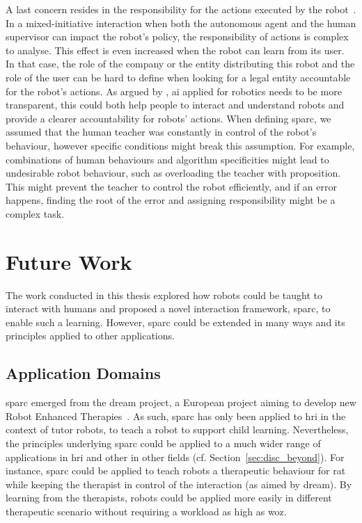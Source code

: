 A last concern resides in the responsibility for the actions executed by the robot~\citep{asaro2007robots}. In a mixed-initiative interaction when both the autonomous agent and the human supervisor can impact the robot's policy, the responsibility of actions is complex to analyse. This effect is even increased when the robot can learn from its user. In that case, the role of the company or the entity distributing this robot and the role of the user can be hard to define when looking for a legal entity accountable for the robot's actions. As argued by \cite{wachter2017transparent}, \gls{ai} applied for robotics needs to be more transparent, this could both help people to interact and understand robots and provide a clearer accountability for robots' actions. When defining \gls{sparc}, we assumed that the human teacher was constantly in control of the robot's behaviour, however specific conditions might break this assumption. For example, combinations of human behaviours and algorithm specificities might lead to undesirable robot behaviour, such as overloading the teacher with proposition. This might prevent the teacher to control the robot efficiently, and if an error happens, finding the root of the error and assigning responsibility might be a complex task.

\section{Future Work}


The work conducted in this thesis explored how robots could be taught to interact with humans and proposed a novel interaction framework, \gls{sparc}, to enable such a learning. However, \gls{sparc} could be extended in many ways and its principles applied to other applications.

\subsection{Application Domains}

\gls{sparc} emerged from the \acrshort{dream} project, a European project aiming to develop new Robot Enhanced Therapies~\citep{thill2012robot,esteban2017build}. As such, \gls{sparc} has only been applied to \gls{hri} in the context of tutor robots, to teach a robot to support child learning. Nevertheless, the principles underlying \gls{sparc} could be applied to a much wider range of applications in \gls{hri} and other in other fields (cf. Section~\ref{sec:disc_beyond}). For instance, \gls{sparc} could be applied to teach robots a therapeutic behaviour for \gls{rat} while keeping the therapist in control of the interaction (as aimed by \acrshort{dream}). By learning from the therapists, robots could be applied more easily in different therapeutic scenario without requiring a workload as high as \gls{woz}. 

